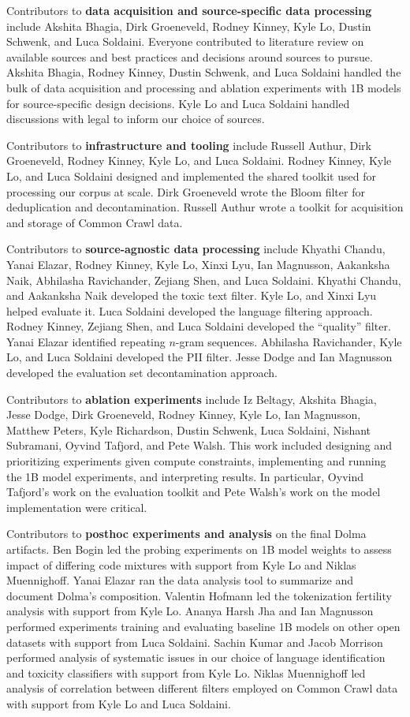 Contributors to \textbf{data acquisition and source-specific data processing} include Akshita Bhagia, Dirk Groeneveld, Rodney Kinney, Kyle Lo, Dustin Schwenk, and Luca Soldaini. Everyone contributed to literature review on available sources and best practices and decisions around sources to pursue. Akshita Bhagia, Rodney Kinney, Dustin Schwenk, and Luca Soldaini handled the bulk of data acquisition and processing and ablation experiments with 1B models for source-specific design decisions. Kyle Lo and Luca Soldaini handled discussions with legal to inform our choice of sources.

Contributors to \textbf{infrastructure and tooling} include Russell Authur, Dirk Groeneveld, Rodney Kinney, Kyle Lo, and Luca Soldaini. Rodney Kinney, Kyle Lo, and Luca Soldaini designed and implemented the shared toolkit used for processing our corpus at scale. Dirk Groeneveld wrote the Bloom filter for deduplication and decontamination. Russell Authur wrote a toolkit for acquisition and storage of Common Crawl data.

Contributors to \textbf{source-agnostic data processing} include Khyathi Chandu, Yanai Elazar, Rodney Kinney, Kyle Lo, Xinxi Lyu, Ian Magnusson, Aakanksha Naik, Abhilasha Ravichander, Zejiang Shen, and Luca Soldaini. Khyathi Chandu, and Aakanksha Naik developed the toxic text filter. Kyle Lo, and Xinxi Lyu helped evaluate it. Luca Soldaini developed the language filtering approach. Rodney Kinney, Zejiang Shen, and Luca Soldaini developed the ``quality'' filter. Yanai Elazar identified repeating $n$-gram sequences. Abhilasha Ravichander, Kyle Lo, and Luca Soldaini developed the PII filter. Jesse Dodge and Ian Magnusson developed the evaluation set decontamination approach. 

Contributors to \textbf{ablation experiments} include Iz Beltagy, Akshita Bhagia, Jesse Dodge, Dirk Groeneveld, Rodney Kinney, Kyle Lo, Ian Magnusson, Matthew Peters, Kyle Richardson, Dustin Schwenk, Luca Soldaini, Nishant Subramani, Oyvind Tafjord, and Pete Walsh. This work included designing and prioritizing experiments given compute constraints, implementing and running the 1B model experiments, and interpreting results. In particular, Oyvind Tafjord's work on the evaluation toolkit and Pete Walsh's work on the model implementation were critical.

Contributors to \textbf{posthoc experiments and analysis} on the final Dolma artifacts. Ben Bogin led the probing experiments on 1B model weights to assess impact of differing code mixtures with support from Kyle Lo and Niklas Muennighoff. Yanai Elazar ran the data analysis tool to summarize and document Dolma's composition. Valentin Hofmann led the tokenization fertility analysis with support from Kyle Lo. 
Ananya Harsh Jha and Ian Magnusson performed experiments training and evaluating baseline 1B models on other open datasets with support from Luca Soldaini.
Sachin Kumar and Jacob Morrison performed analysis of systematic issues in our choice of language identification and toxicity classifiers with support from Kyle Lo.
Niklas Muennighoff led analysis of correlation between different filters employed on Common Crawl data with support from Kyle Lo and Luca Soldaini.

